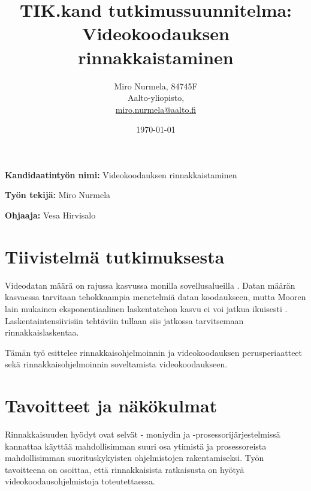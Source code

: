 \documentclass[12pt,a4paper,finnish,oneside]{article}
\begin{document}

\title{TIK.kand tutkimussuunnitelma:\\[5mm]
Videokoodauksen rinnakkaistaminen}

\author{Miro Nurmela, 84745F\\
Aalto-yliopisto,\\
\url{miro.nurmela@aalto.fi}}

\date{\today}

\maketitle


\vspace{10mm}

%

\textbf{Kandidaatintyön nimi:} Videokoodauksen rinnakkaistaminen

\textbf{Työn tekijä:} Miro Nurmela

\textbf{Ohjaaja:} Vesa Hirvisalo


\section{Tiivistelmä tutkimuksesta}

Videodatan määrä on rajussa kasvussa monilla sovellusalueilla \cite{cisco}
\cite{youtube}. Datan määrän kasvaessa tarvitaan tehokkaampia menetelmiä
datan koodaukseen, mutta  Mooren lain mukainen eksponentiaalinen laskentatehon
kasvu ei voi jatkua ikuisesti \cite{sutter}. Laskentaintensiivisiin tehtäviin
tullaan siis jatkossa tarvitsemaan rinnakkaislaskentaa.

Tämän työ esittelee rinnakkaisohjelmoinnin ja videokoodauksen perusperiaatteet
sekä rinnakkaisohjelmoinnin soveltamista videokoodaukseen.

\section{Tavoitteet ja näkökulmat}

Rinnakkaisuuden hyödyt ovat selvät - moniydin ja -prosessorijärjestelmissä
kannattaa käyttää mahdollisimman suuri osa ytimistä ja prosessoreista
mahdollisimman suorituskykyisten ohjelmistojen rakentamiseksi. Työn tavoitteena on
osoittaa, että rinnakkaisista ratkaisusta on hyötyä videokoodausohjelmistoja
toteutettaessa.
\end{document}
